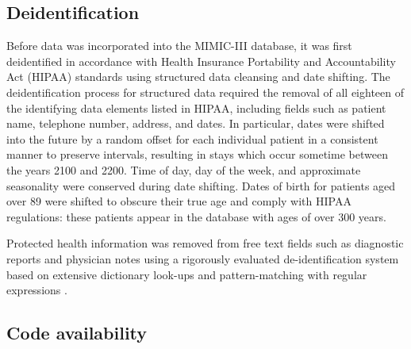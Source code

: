 \documentclass[english]{article}
\begin{document}
\subsection*{Deidentification}

Before data was incorporated into the MIMIC-III database, it was first deidentified in accordance with Health Insurance Portability and Accountability Act (HIPAA) standards using structured data cleansing and date shifting. The deidentification process for structured data required the removal of all eighteen of the identifying data elements listed in HIPAA, including fields such as patient name, telephone number, address, and dates. In particular, dates were shifted into the future by a random offset for each individual patient in a consistent manner to preserve intervals, resulting in stays which occur sometime between the years 2100 and 2200. Time of day, day of the week, and approximate seasonality were conserved during date shifting. Dates of birth for patients aged over 89 were shifted to obscure their true age and comply with HIPAA regulations: these patients appear in the database with ages of over 300 years. 

Protected health information was removed from free text fields such as diagnostic reports and physician notes using a rigorously evaluated de-identification system based on extensive dictionary look-ups and pattern-matching with regular expressions \cite{cite5}.

\subsection*{Code availability}



\end{document}
